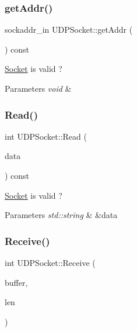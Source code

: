 \subsubsection{\texorpdfstring{get\+Addr()}{getAddr()}}
{\footnotesize\ttfamily sockaddr\+\_\+in U\+D\+P\+Socket\+::get\+Addr (\begin{DoxyParamCaption}{ }\end{DoxyParamCaption}) const}



\hyperlink{class_socket}{Socket} is valid ? 


\begin{DoxyParams}{Parameters}
{\em void} & \\
\hline
\end{DoxyParams}
\mbox{\label{class_u_d_p_socket_a4a97e4188e1c07646310d390993e93d2}} 
\subsubsection{\texorpdfstring{Read()}{Read()}}
{\footnotesize\ttfamily int U\+D\+P\+Socket\+::\+Read (\begin{DoxyParamCaption}\item[{std\+::string \&}]{data }\end{DoxyParamCaption}) const}



\hyperlink{class_socket}{Socket} is valid ? 


\begin{DoxyParams}{Parameters}
{\em std\+::string} & \&data \\
\hline
\end{DoxyParams}
\mbox{\label{class_u_d_p_socket_a0193bec0a3668e7bf9ca043bb4152ab8}} 
\subsubsection{\texorpdfstring{Receive()}{Receive()}}
{\footnotesize\ttfamily int U\+D\+P\+Socket\+::\+Receive (\begin{DoxyParamCaption}\item[{char $\ast$}]{buffer,  }\item[{unsigned int}]{len }\end{DoxyParamCaption})}




